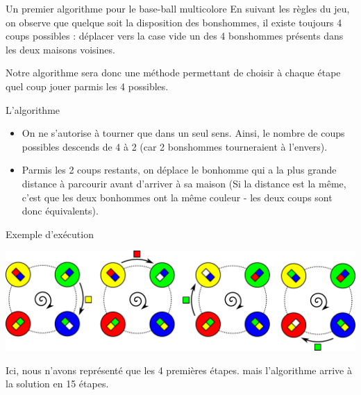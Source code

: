 \begin{frame}{Un premier algorithme pour le base-ball multicolore}
  En suivant les règles du jeu, on observe que quelque soit la disposition des bonshommes, il existe toujours 4 coups possibles : déplacer vers la case vide un des 4 bonshommes présents dans les deux maisons voisines.

  Notre algorithme sera donc une méthode permettant de choisir à chaque étape quel coup jouer parmis les 4 possibles.

  \begin{block}{L'algorithme}
    \begin{itemize}
    \item On ne s'autorise à tourner que dans un seul sens. Ainsi, le nombre de coups possibles descends de 4 à 2 (car 2 bonshommes tourneraient à l'envers).
    \item Parmis les 2 coups restants, on déplace le bonhomme qui a la plus grande distance à parcourir avant d'arriver à sa maison (Si la distance est la même, c'est que les deux bonhommes ont la même couleur - les deux coups sont donc équivalents).
    \end{itemize}
  \end{block}

  \begin{block}{Exemple d'exécution}
    \begin{center}
      \includegraphics[width=\linewidth]{img/baseball_ex1.pdf}
    \end{center}

  Ici, nous n'avons représenté que les 4 premières étapes. mais l'algorithme arrive à la solution en 15 étapes.
  \end{block}
\end{frame}

